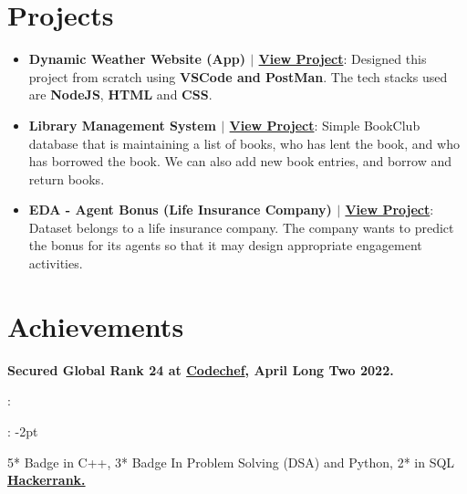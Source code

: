 \documentclass[letterpaper,11pt]{article}
\newcommand{\resumeItem}[2]{
  \item\small{
    \textbf{#1}{: #2 \vspace{-2pt}}
  }
}
\newcommand{\resumeSubItem}[2]{\resumeItem{#1}{#2}\vspace{-4pt}}
\newcommand{\resumeSubHeadingListStart}{\begin{itemize}[leftmargin=*]}
\newcommand{\resumeSubHeadingListEnd}{\end{itemize}}
\newcommand{\resumeItemListStart}{\begin{itemize}}
\newcommand{\resumeItemListEnd}{\end{itemize}\vspace{-5pt}}
\begin{document}
\section{Projects}
  \resumeSubHeadingListStart
    \resumeSubItem{\textbf{Dynamic Weather Website (App)} $|$ {\href{https://www.codedynamics.in/}{\bf View Project}}}
      {Designed this project from scratch using \textbf{VSCode and PostMan}. The tech stacks used are \textbf{NodeJS}, \textbf{HTML} and \textbf{CSS}.}
    \resumeSubItem{\textbf{Library Management System} $|$ {\href{https://yuthikakhedwal.github.io/LibraryManagementSystem/}{\bf View Project}}}
      {Simple BookClub database that is maintaining a list of books, who has lent the book, and who has borrowed the book. We can also add new book entries, and borrow and return books.}
    \resumeSubItem{\textbf{EDA - Agent Bonus (Life Insurance Company)} $|$ {\href{https://github.com/YuthikaKhedwal/DataScience/tree/main/Bonus-Life-Insurance}{\bf View Project}}}
      {Dataset belongs to a life insurance company. The company wants to predict the bonus for its agents so that it may design appropriate engagement activities.}
  \resumeSubHeadingListEnd


\section{Achievements}
 \resumeSubHeadingListStart
    	\resumeItem{Secured Global Rank \textbf{24} at {\href{https://www.codechef.com/users/yuthikakhedwal}{\bf Codechef}, April Long Two 2022.}}
    	
    	\resumeItem{5* Badge in C++, 3* Badge In Problem Solving (DSA) and Python, 2* in SQL {\href{https://www.hackerrank.com/h1906150}{\bf Hackerrank.}}}
 \resumeSubHeadingListEnd
 \vspace{-16pt}
 

\end{document}
